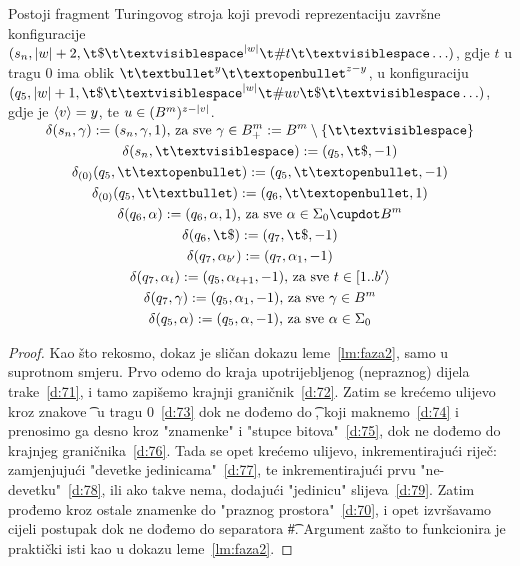 \begin{lema}\label{lm:faza4}
Postoji fragment Turingovog stroja koji prevodi reprezentaciju završne konfiguracije $(s_n,\dulj w+2,\t\$\bl^{\dulj w}\t\#t\bl\ldots)$, gdje $t$ u tragu $0$ ima oblik $\t\textbullet^y\t\textopenbullet^{z-y}$, u konfiguraciju $(q_5,\dulj w+1,\t\$\bl^{\dulj w}\t\#uv\t\$\bl\ldots)$, gdje je $\langle v\rangle=y$, te $u\in(B^m)^{z-\lvert v\rvert}$.
\end{lema}
\noindent\begin{gather}
\SwapAboveDisplaySkip
\label{d:71}\delta(s_n,\gamma):=(s_n,\gamma,1)\text{, za sve } \gamma\in B^m_+:=B^m\setminus\{\bl\}\\
\label{d:72}\delta(s_n,\bl):=(q_5,\t\$,-1)\\
\label{d:73}\delta_{(0)}(q_5,\t\textopenbullet):=(q_5,\t\textopenbullet,-1)\\
\label{d:74}\delta_{(0)}(q_5,\t\textbullet):=(q_6,\t\textopenbullet,1)\\
\label{d:75}\delta(q_6,\alpha):=(q_6,\alpha,1)\text{, za sve }\alpha\in\Sigma_0\dcup B^m\\
\label{d:76}\delta(q_6,\t\$):=(q_7,\t\$,-1)\\
\label{d:77}\delta(q_7,\alpha_{b'}):=(q_7,\alpha_1,-1)\\
\label{d:78}\delta(q_7,\alpha_t):=(q_5,\alpha_{t+1},-1)\text{, za sve }t\in[1..b'\rangle\\
\label{d:79}\delta(q_7,\gamma):=(q_5,\alpha_1,-1)\text{, za sve }\gamma\in B^m\\
\label{d:70}\delta(q_5,\alpha):=(q_5,\alpha,-1)\text{, za sve }\alpha\in\Sigma_0
\end{gather}

\begin{proof}
Kao što rekosmo, dokaz je sličan dokazu leme~\ref{lm:faza2}, samo u suprotnom smjeru. Prvo odemo do kraja upotrijebljenog (nepraznog) dijela trake~\eqref{d:71}, i tamo zapišemo krajnji graničnik~\eqref{d:72}. Zatim se krećemo ulijevo kroz znakove \t\textopenbullet\ u tragu $0$~\eqref{d:73} dok ne dođemo do \t\textbullet, koji maknemo~\eqref{d:74} i prenosimo ga desno kroz "znamenke" i "stupce bitova"~\eqref{d:75}, dok ne dođemo do krajnjeg graničnika~\eqref{d:76}. Tada se opet krećemo ulijevo, inkrementirajući riječ: zamjenjujući "devetke jedinicama"~\eqref{d:77}, te inkrementirajući prvu "ne-devetku"~\eqref{d:78}, ili ako takve nema, dodajući "jedinicu" slijeva~\eqref{d:79}. Zatim prođemo kroz ostale znamenke do "praznog prostora"~\eqref{d:70}, i opet izvršavamo cijeli postupak dok ne dođemo do separatora \t\#.
Argument zašto to funkcionira je praktički isti kao u dokazu leme~\ref{lm:faza2}. %
\end{proof}


